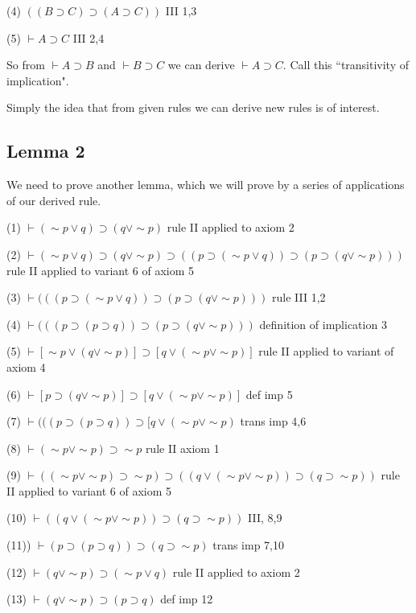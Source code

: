\documentclass[12pt]{article}
\begin{document}
(4) $((B \supset C) \supset (A \supset C))$  III  1,3

(5)  $\vdash A \supset C$  III 2,4

So from $\vdash A \supset B$ and $\vdash B \supset C$ we can derive $\vdash A \supset C$.  Call this ``transitivity of implication".

Simply the idea that from given rules we can derive new rules is of interest.

\subsection{Lemma 2}

We need to prove another lemma, which we will prove by a series of applications of our derived rule.

(1) $\vdash (\sim p \vee q) \supset (q \vee \sim p)$  rule II applied to axiom 2

(2) $\vdash (\sim p \vee q) \supset (q \vee \sim p) \supset ((p \supset (\sim p \vee q)) \supset (p \supset (q \vee \sim p)))$  rule II applied to variant 6 of axiom 5

(3) $\vdash (((p \supset (\sim p \vee q)) \supset (p \supset (q \vee \sim p)))$  rule III  1,2

(4) $\vdash (((p \supset (p \supset q)) \supset (p \supset (q \vee \sim p)))$ definition of implication 3

(5) $\vdash [\sim p \vee  (q \vee \sim p)] \supset [q \vee (\sim p \vee \sim p)]$ rule II applied to variant of axiom 4

(6) $\vdash [p \supset  (q \vee \sim p)] \supset [q \vee (\sim p \vee \sim p)]$ def imp 5

(7) $\vdash (((p \supset (p \supset q)) \supset [q \vee (\sim p \vee \sim p)$  trans imp 4,6

(8)  $\vdash (\sim p \vee \sim p) \supset \sim p$  rule II axiom 1

(9) $\vdash ((\sim p \vee \sim p) \supset \sim p)\supset ((q \vee (\sim p \vee \sim p)) \supset (q \supset \sim p))$  rule II applied to variant 6 of axiom 5

(10) $\vdash ((q \vee (\sim p \vee \sim p)) \supset (q \supset \sim p))$  III, 8,9

(11)) $\vdash (p \supset (p \supset q) ) \supset (q \supset \sim p)$  trans imp 7,10

(12) $\vdash (q \vee \sim p) \supset (\sim p \vee q)$  rule II applied to axiom 2

(13) $\vdash (q \vee \sim p) \supset (p \supset q)$  def imp 12
\end{document}
